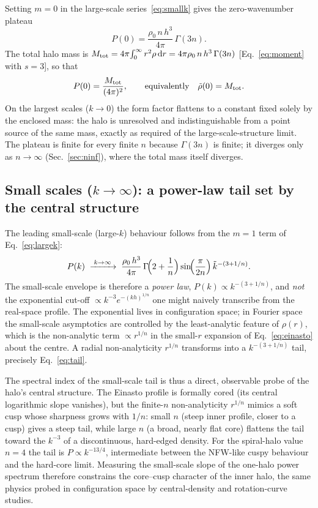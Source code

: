 \documentclass[aps,prd,onecolumn]{revtex4-2}
\newcommand{\kt}{\tilde{k}}          %
\begin{document}
Setting $m=0$ in the large-scale series~\eqref{eq:smallk} gives the
zero-wavenumber plateau
\begin{equation}
P(0)=\frac{\rho_0\,n\,h^3}{4\pi}\,\Gamma(3n).
\label{eq:Pzero}
\end{equation}
The total halo mass is
$M_{\rm tot}=4\pi\!\int_0^\infty r^2\rho\,\mathrm{d}r
=4\pi\rho_0\,n\,h^3\,\Gamma(3n)$
[Eq.~\eqref{eq:moment} with $s=3$], so that
\begin{equation}
P(0)=\frac{M_{\rm tot}}{(4\pi)^2},
\qquad\text{equivalently}\quad \tilde\rho(0)=M_{\rm tot}.
\label{eq:pointmass}
\end{equation}
On the largest scales ($k\to0$) the form factor flattens to a constant
fixed solely by the enclosed mass: the halo is unresolved and
indistinguishable from a point source of the same mass, exactly as
required of the large-scale-structure limit.  The plateau is finite for
every finite $n$ because $\Gamma(3n)$ is finite; it diverges only as
$n\to\infty$ (Sec.~\ref{sec:ninf}), where the total mass itself diverges.

\subsection{Small scales ($k\to\infty$): a power-law tail set by the
central structure}
\label{sec:kinf}

The leading small-scale (large-$k$) behaviour follows from the $m=1$ term
of Eq.~\eqref{eq:largek}:
\begin{equation}
P(k)\;\xrightarrow{\;k\to\infty\;}\;
\frac{\rho_0\,h^3}{4\pi}\,
\Gamma\!\Bigl(2+\frac1n\Bigr)\sin\!\Bigl(\frac{\pi}{2n}\Bigr)\,
\kt^{-(3+1/n)} .
\label{eq:tail}
\end{equation}
The small-scale envelope is therefore a \emph{power law},
$P(k)\propto k^{-(3+1/n)}$, and \emph{not} the exponential cut-off
$\propto k^{-3}e^{-(kh)^{1/n}}$ one might naively transcribe from the
real-space profile.  The exponential lives in configuration space; in
Fourier space the small-scale asymptotics are controlled by the
least-analytic feature of $\rho(r)$, which is the non-analytic term
$\propto r^{1/n}$ in the small-$r$ expansion of Eq.~\eqref{eq:einasto}
about the centre.  A radial non-analyticity $r^{1/n}$ transforms into a
$k^{-(3+1/n)}$ tail, precisely Eq.~\eqref{eq:tail}.

The spectral index of the small-scale tail is thus a direct, observable
probe of the halo's central structure.  The Einasto profile is formally
cored (its central logarithmic slope vanishes), but the finite-$n$
non-analyticity $r^{1/n}$ mimics a soft cusp whose sharpness grows with
$1/n$: small $n$ (steep inner profile, closer to a cusp) gives a steep tail,
while large $n$ (a broad, nearly flat core) flattens the tail toward the
$k^{-3}$ of a discontinuous, hard-edged density.  For the spiral-halo value
$n=4$ the tail is $P\propto k^{-13/4}$, intermediate between the
NFW-like cuspy behaviour and the hard-core limit.  Measuring the
small-scale slope of the one-halo power spectrum therefore constrains the
core--cusp character of the inner halo, the same physics probed in
configuration space by central-density and rotation-curve studies.
\end{document}
